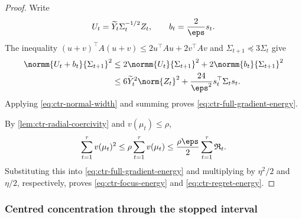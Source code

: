 \begin{proof}
    Write
    \begin{align}
        U_t=\widetilde Y_t\Sigma_t^{-1/2}Z_t,
        \qquad
        b_t=\frac2\eps s_t.
    \end{align}
    The inequality $(u+v)^\top A(u+v)\leq2u^\top Au+2v^\top Av$ and
    $\Sigma_{t+1}\preceq3\Sigma_t$ give
    \begin{align}
        \normm{U_t+b_t}{\Sigma_{t+1}}^2
         & \leq2\normm{U_t}{\Sigma_{t+1}}^2
        +2\normm{b_t}{\Sigma_{t+1}}^2
        \\
         & \leq6\widetilde Y_t^2\norm{Z_t}^2
        +\frac{24}{\eps^2}s_t^\top\Sigma_ts_t.
    \end{align}
    Applying \eqref{eq:ctr-normal-width} and summing proves
    \eqref{eq:ctr-full-gradient-energy}.

    By \cref{lem:ctr-radial-coercivity} and $v(\mu_t)\leq\rho$,
    \begin{align}
        \sum_{t=1}^{\tau}v(\mu_t)^2
        \leq\rho\sum_{t=1}^{\tau}v(\mu_t)
        \leq\frac{\rho\eps}{2}
        \sum_{t=1}^{\tau}\mathfrak R_t.
    \end{align}
    Substituting this into \eqref{eq:ctr-full-gradient-energy} and multiplying
    by $\eta^2/2$ and $\eta/2$, respectively, proves
    \eqref{eq:ctr-focus-energy} and \eqref{eq:ctr-regret-energy}.
\end{proof}

\subsubsection{Centred concentration through the stopped interval}

